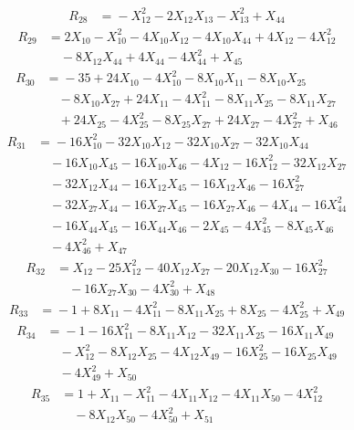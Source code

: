 \[\begin{aligned}
R_{28} &={}-X_{12}^{2} - 2X_{12}X_{13} - X_{13}^{2} + X_{44}
\end{aligned}\]
\[\begin{aligned}
R_{29} &={}2X_{10} - X_{10}^{2} - 4X_{10}X_{12} - 4X_{10}X_{44} + 4X_{12} - 4X_{12}^{2}\\
&\quad{} - 8X_{12}X_{44} + 4X_{44} - 4X_{44}^{2} + X_{45}
\end{aligned}\]
\[\begin{aligned}
R_{30} &={}-35 + 24X_{10} - 4X_{10}^{2} - 8X_{10}X_{11} - 8X_{10}X_{25}\\
&\quad{} - 8X_{10}X_{27} + 24X_{11} - 4X_{11}^{2} - 8X_{11}X_{25} - 8X_{11}X_{27}\\
&\quad{} + 24X_{25} - 4X_{25}^{2} - 8X_{25}X_{27} + 24X_{27} - 4X_{27}^{2} + X_{46}
\end{aligned}\]
\[\begin{aligned}
R_{31} &={}-16X_{10}^{2} - 32X_{10}X_{12} - 32X_{10}X_{27} - 32X_{10}X_{44}\\
&\quad{} - 16X_{10}X_{45} - 16X_{10}X_{46} - 4X_{12} - 16X_{12}^{2} - 32X_{12}X_{27}\\
&\quad{} - 32X_{12}X_{44} - 16X_{12}X_{45} - 16X_{12}X_{46} - 16X_{27}^{2}\\
&\quad{} - 32X_{27}X_{44} - 16X_{27}X_{45} - 16X_{27}X_{46} - 4X_{44} - 16X_{44}^{2}\\
&\quad{} - 16X_{44}X_{45} - 16X_{44}X_{46} - 2X_{45} - 4X_{45}^{2} - 8X_{45}X_{46}\\
&\quad{} - 4X_{46}^{2} + X_{47}
\end{aligned}\]
\[\begin{aligned}
R_{32} &={}X_{12} - 25X_{12}^{2} - 40X_{12}X_{27} - 20X_{12}X_{30} - 16X_{27}^{2}\\
&\quad{} - 16X_{27}X_{30} - 4X_{30}^{2} + X_{48}
\end{aligned}\]
\[\begin{aligned}
R_{33} &={}-1 + 8X_{11} - 4X_{11}^{2} - 8X_{11}X_{25} + 8X_{25} - 4X_{25}^{2} + X_{49}
\end{aligned}\]
\[\begin{aligned}
R_{34} &={}-1 - 16X_{11}^{2} - 8X_{11}X_{12} - 32X_{11}X_{25} - 16X_{11}X_{49}\\
&\quad{} - X_{12}^{2} - 8X_{12}X_{25} - 4X_{12}X_{49} - 16X_{25}^{2} - 16X_{25}X_{49}\\
&\quad{} - 4X_{49}^{2} + X_{50}
\end{aligned}\]
\[\begin{aligned}
R_{35} &={}1 + X_{11} - X_{11}^{2} - 4X_{11}X_{12} - 4X_{11}X_{50} - 4X_{12}^{2}\\
&\quad{} - 8X_{12}X_{50} - 4X_{50}^{2} + X_{51}
\end{aligned}\]
